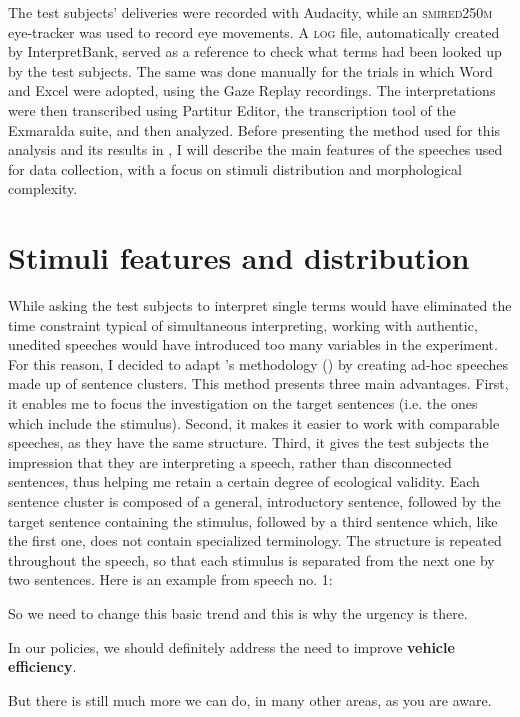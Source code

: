 \documentclass[output=paper]{langsci/langscibook}
\begin{document}
The test subjects’ deliveries were recorded with Audacity, while an \textsc{smi\linebreak red250m} eye-tracker was used to record eye movements. A \textsc{log} file, automatically created by InterpretBank, served as a reference to check what terms had been looked up by the test subjects. The same was done manually for the trials in which Word and Excel were adopted, using the Gaze Replay recordings. The interpretations were then transcribed using Partitur Editor, the transcription tool of the Exmaralda suite, and then analyzed. Before presenting the method used for this analysis and its results in , I will describe the main features of the speeches used for data collection, with a focus on stimuli distribution and morphological complexity.

\section{Stimuli features and distribution}\label{sec:prandi:4}
While asking the test subjects to interpret single terms would have eliminated the time constraint typical of simultaneous interpreting, working with authentic, unedited speeches would have introduced too many variables in the experiment. For this reason, I decided to adapt \citeauthor{Seeber2011a}’s methodology (\citeyear{Seeber2011a}) by creating ad-hoc speeches made up of sentence clusters. This method presents three main advantages. First, it enables me to focus the investigation on the target sentences (i.e. the ones which include the stimulus). Second, it makes it easier to work with comparable speeches, as they have the same structure. Third, it gives the test subjects the impression that they are interpreting a speech, rather than disconnected sentences, thus helping me retain a certain degree of ecological validity. Each sentence cluster is composed of a general, introductory sentence, followed by the target sentence containing the stimulus, followed by a third sentence which, like the first one, does not contain specialized terminology. The structure is repeated throughout the speech, so that each stimulus is separated from the next one by two sentences. Here is an example from speech no. 1:

\ea
So we need to change this basic trend and this is why the urgency is there.

In our policies, we should definitely address the need to improve \textbf{vehicle efficiency}.

But there is still much more we can do, in many other areas, as you are aware.
\end{document}
